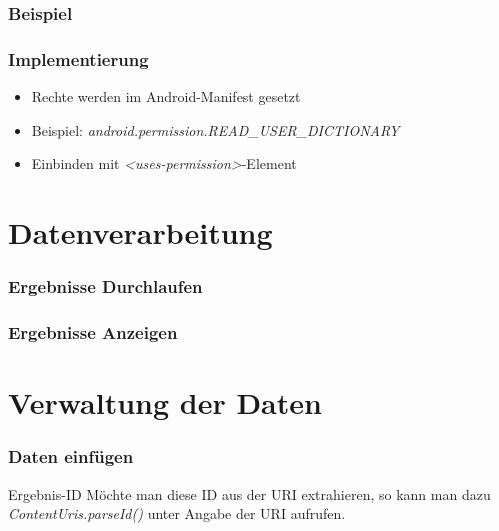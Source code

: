 \begin{frame}
   \frametitle{Beispiel}
	
\end{frame}

\begin{frame}
   \frametitle{Implementierung}
   \begin{itemize}
   	\item Rechte werden im Android-Manifest gesetzt
   	\item Beispiel: \emph{android.permission.READ\_USER\_DICTIONARY}
   	\item Einbinden mit \emph{\textless{}uses-permission\textgreater}-Element
   \end{itemize}

	

	
\end{frame}

\section{Datenverarbeitung}
\begin{frame}
   \frametitle{Ergebnisse Durchlaufen}
	
\end{frame}

\begin{frame}
   \frametitle{Ergebnisse Anzeigen}
	
\end{frame}

\section{Verwaltung der Daten}
\begin{frame}
   \frametitle{Daten einfügen}
	
		
	\begin{alertblock}{Ergebnis-ID}
		Möchte man diese ID aus der URI extrahieren, so kann man dazu 
		\emph{ContentUris.parseId()} unter Angabe der URI aufrufen.
	\end{alertblock}
\end{frame}

